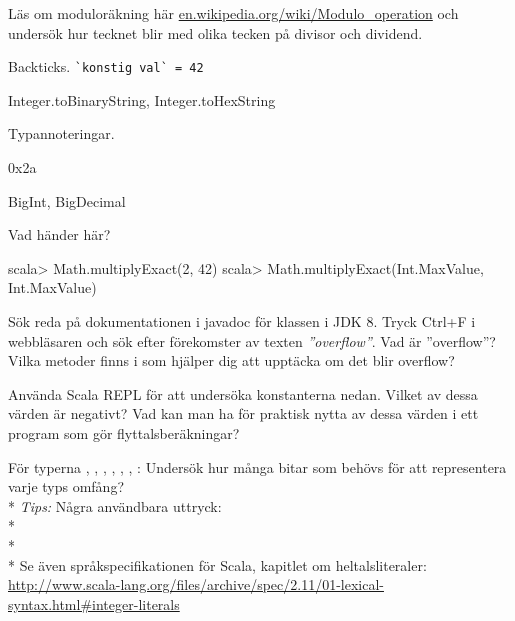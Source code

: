 {{{{\AdvancedTasks

\Task Läs om moduloräkning här \href{https://en.wikipedia.org/wiki/Modulo\_operation}{en.wikipedia.org/wiki/Modulo\_operation} och undersök hur tecknet blir med olika tecken på divisor och dividend.



\Task Backticks. \texttt{\`{}konstig val\`{} = 42}   %



\Task Integer.toBinaryString, Integer.toHexString

\Task Typannoteringar.

\Task 0x2a

\Task {}

\Task BigInt, BigDecimal

\Task Vad händer här? 
\begin{REPLnonum}
scala> Math.multiplyExact(2, 42)
scala> Math.multiplyExact(Int.MaxValue, Int.MaxValue)
\end{REPLnonum}

\Task Sök reda på dokumentationen i javadoc för klassen  i JDK 8. Tryck Ctrl+F i webbläsaren och sök efter förekomster av texten \textit{''overflow''}. Vad är ''overflow''? Vilka metoder finns i  som hjälper dig att upptäcka om det blir overflow?

\Task Använda Scala REPL för att undersöka konstanterna nedan. Vilket av dessa värden är negativt? Vad kan man ha för praktisk nytta av dessa värden i ett program som gör flyttalsberäkningar?

\Subtask {}

\Subtask {} 

\Subtask {}

\Task För typerna , , , , , , : Undersök hur många bitar som behövs för att representera varje typs omfång? \\*
\textit{Tips:} Några användbara uttryck: \\*
  \\*
  \\*
Se även språkspecifikationen för Scala, kapitlet om heltalsliteraler: \\
\url{http://www.scala-lang.org/files/archive/spec/2.11/01-lexical-syntax.html#integer-literals}

}}}}
